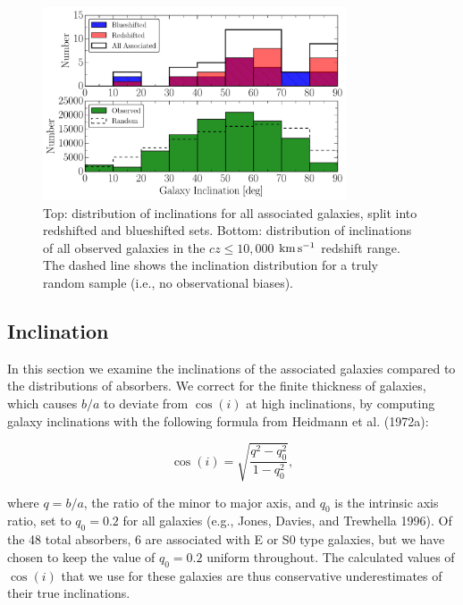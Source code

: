 \begin{figure}[h!]
        \centering
        \includegraphics[width=0.8\textwidth]{Chap3/figures/fig9.pdf}
        \caption{\small{Top: distribution of inclinations for all associated galaxies, split into redshifted and blueshifted sets. Bottom: distribution of inclinations of all observed galaxies in the $cz \leq 10,000$ $\rm km\, s^{-1}$ redshift range. The dashed line shows the inclination distribution for a truly random sample (i.e., no observational biases).}}
        \label{hist_inc}
        \vspace{2pt}
\end{figure}


\vspace{10pt}


\subsection{Inclination}
\label{inclination}

In this section we examine the inclinations of the associated galaxies compared to the distributions of absorbers. We correct for the finite thickness of galaxies, which causes $b/a$ to deviate from $\cos(i)$ at high inclinations, by computing galaxy inclinations with the following formula from Heidmann et al. (1972a):

\begin{equation}
	\cos(i) = \sqrt{\frac{q^2 - q_0^2}{1 - q_0^2}},
	\label{incEq}
\end{equation}

\noindent where $q = b/a$, the ratio of the minor to major axis, and $q_0$ is the intrinsic axis ratio, set to $q_0 = 0.2$ for all galaxies (e.g., Jones, Davies, and Trewhella 1996). Of the 48 total absorbers, 6 are associated with E or S0 type galaxies, but we have chosen to keep the value of $q_0 = 0.2$ uniform throughout. The calculated values of $\cos(i)$ that we use for these galaxies are thus conservative underestimates of their true inclinations.

